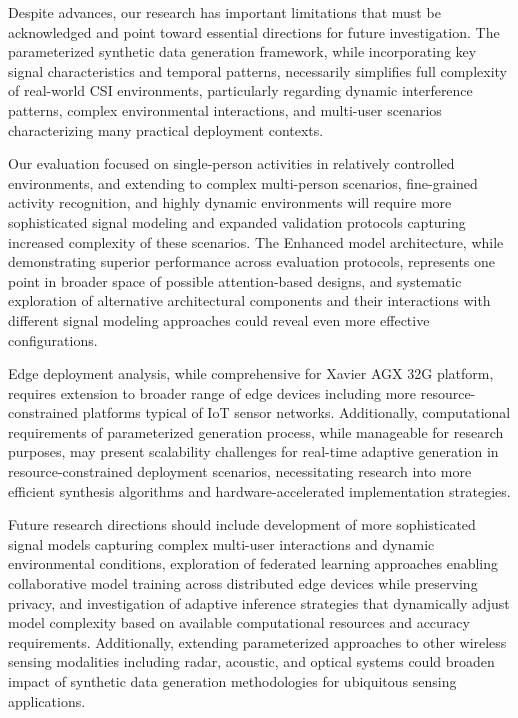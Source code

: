 \documentclass[journal]{IEEEtran}
\begin{document}
Despite advances, our research has important limitations that must be acknowledged and point toward essential directions for future investigation. The parameterized synthetic data generation framework, while incorporating key signal characteristics and temporal patterns, necessarily simplifies full complexity of real-world CSI environments, particularly regarding dynamic interference patterns, complex environmental interactions, and multi-user scenarios characterizing many practical deployment contexts.

Our evaluation focused on single-person activities in relatively controlled environments, and extending to complex multi-person scenarios, fine-grained activity recognition, and highly dynamic environments will require more sophisticated signal modeling and expanded validation protocols capturing increased complexity of these scenarios. The Enhanced model architecture, while demonstrating superior performance across evaluation protocols, represents one point in broader space of possible attention-based designs, and systematic exploration of alternative architectural components and their interactions with different signal modeling approaches could reveal even more effective configurations.

Edge deployment analysis, while comprehensive for Xavier AGX 32G platform, requires extension to broader range of edge devices including more resource-constrained platforms typical of IoT sensor networks. Additionally, computational requirements of parameterized generation process, while manageable for research purposes, may present scalability challenges for real-time adaptive generation in resource-constrained deployment scenarios, necessitating research into more efficient synthesis algorithms and hardware-accelerated implementation strategies.

Future research directions should include development of more sophisticated signal models capturing complex multi-user interactions and dynamic environmental conditions, exploration of federated learning approaches enabling collaborative model training across distributed edge devices while preserving privacy, and investigation of adaptive inference strategies that dynamically adjust model complexity based on available computational resources and accuracy requirements. Additionally, extending parameterized approaches to other wireless sensing modalities including radar, acoustic, and optical systems could broaden impact of synthetic data generation methodologies for ubiquitous sensing applications.
\end{document}
